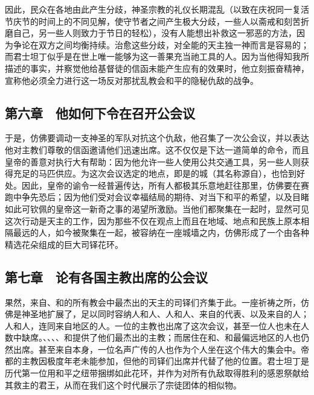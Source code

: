 因此，民众在各地由此产生分歧，神圣宗教的礼仪长期混乱（以致在庆祝同一复活节庆节的时间上的不同见解，使守节者之间产生极大分歧，一些人以斋戒和刻苦折磨自己，另一些人则致力于节日的轻松），没有人能想出补救这一邪恶的方法，因为争论在双方之间均衡持续。治愈这些分歧，对全能的天主独一神而言是容易的；而君士坦丁似乎是在世上唯一能够为这一善果充当祂工具的人。因为当他得知我所描述的事实，并察觉他给基督徒的信函未能产生应有的效果时，他立刻振奋精神，宣称他必须全力进行这一场反对那扰乱教会和平的隐秘仇敌的战争。\par


\subsection{第六章　他如何下令在召开公会议}

于是，仿佛要调动一支神圣的军队对抗这个仇敌，他召集了一次公会议，并以表达他对主教们尊敬的信函邀请他们迅速出席。这不仅仅是下达一道简单的命令，而且皇帝的善意对执行大有帮助：因为他允许一些人使用公共交通工具，另一些人则获得充足的马匹供应。为这次会议选定的地点，即是的城（其名称源自），也恰到好处。因此，皇帝的谕令一经普遍传达，所有人都极其乐意地赶往那里，仿佛要在赛跑中争先恐后；因为他们受对会议幸福结局的期待、对当下和平的希望，以及目睹如此可钦佩的皇帝这一新奇之事的渴望所激励。当他们都聚集在一起时，显然可见这次行动是天主的工作，因为那些不仅在观点上而且在地域、地点和民族上原本相隔最远的人，如今被聚集在一起，被容纳在一座城墙之内，仿佛形成了一个由各种精选花朵组成的巨大司铎花环。\par


\subsection{第七章　论有各国主教出席的公会议}

果然，来自、和的所有教会中最杰出的天主的司铎们齐集于此。一座祈祷之所，仿佛是神圣地扩展了，足以同时容纳人和人、人和人、来自的代表、以及来自的人；人和人，连同来自地区的人。一位的主教也出席了这次会议，甚至一位人也未在人数中缺席。、、、、和提供了他们最杰出的主教；而居住在和、和最偏远地区的人也仍然出席。甚至来自本身，一位名声广传的人也作为个人坐在这个伟大的集会中。帝都的主教因极度年老未能参加，但他的司铎们出席并代替了他的位置。君士坦丁是历代第一位用和平之纽带捆绑如此花环，并作为对所有仇敌取得胜利的感恩祭献给其救主的君王，从而在我们这个时代展示了宗徒团体的相似物。\par

